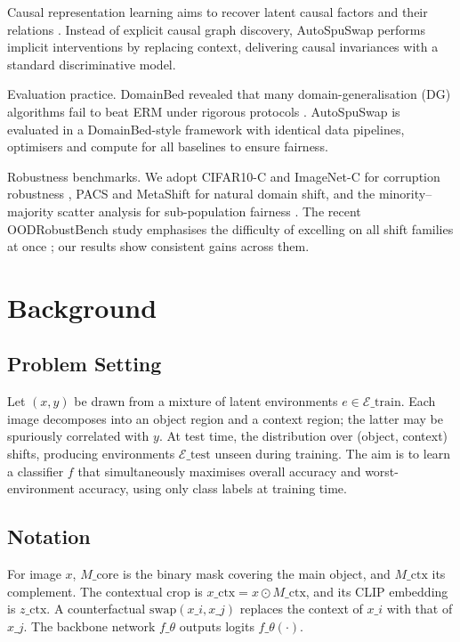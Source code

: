 \documentclass{article}
\begin{document}
Causal representation learning aims to recover latent causal factors and their relations \cite{lippe-2022-causal,morioka-2023-causal}. Instead of explicit causal graph discovery, AutoSpuSwap performs implicit interventions by replacing context, delivering causal invariances with a standard discriminative model.

Evaluation practice. DomainBed revealed that many domain-generalisation (DG) algorithms fail to beat ERM under rigorous protocols \cite{gulrajani-2020-search}. AutoSpuSwap is evaluated in a DomainBed-style framework with identical data pipelines, optimisers and compute for all baselines to ensure fairness.

Robustness benchmarks. We adopt CIFAR10-C and ImageNet-C for corruption robustness \cite{hendrycks-2019-benchmarking}, PACS and MetaShift for natural domain shift, and the minority–majority scatter analysis for sub-population fairness \cite{liang-2023-accuracy}. The recent OODRobustBench study emphasises the difficulty of excelling on all shift families at once \cite{li-2023-oodrobustbench}; our results show consistent gains across them.

\section{Background}
\subsection{Problem Setting}
Let \((x,y)\) be drawn from a mixture of latent environments \(e\in \mathcal{E}\_{\text{train}}\). Each image decomposes into an object region and a context region; the latter may be spuriously correlated with \(y\). At test time, the distribution over (object, context) shifts, producing environments \(\mathcal{E}\_{\text{test}}\) unseen during training. The aim is to learn a classifier \(f\) that simultaneously maximises overall accuracy and worst-environment accuracy, using only class labels at training time.

\subsection{Notation}
For image \(x\), \(M\_{\text{core}}\) is the binary mask covering the main object, and \(M\_{\text{ctx}}\) its complement. The contextual crop is \(x\_{\text{ctx}} = x \odot M\_{\text{ctx}}\), and its CLIP embedding is \(z\_{\text{ctx}}\). A counterfactual \(\mathrm{swap}(x\_i, x\_j)\) replaces the context of \(x\_i\) with that of \(x\_j\). The backbone network \(f\_{\theta}\) outputs logits \(f\_{\theta}(\cdot)\).
\end{document}

